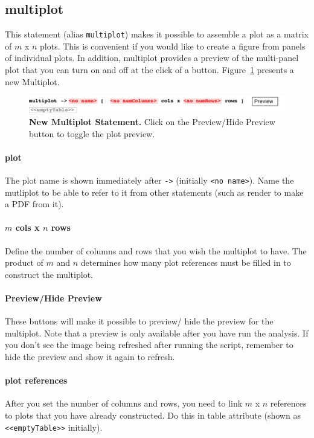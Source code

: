\subsection{multiplot}\label{subsec:Multiplot}
This statement (alias \texttt{multiplot}) makes it possible to assemble a plot as a matrix of $m$ x $n$ plots. This is convenient if you would like to create a figure from panels of individual plots. In addition, multiplot provides a preview of the multi-panel plot that you can turn on and off at the click of a button. Figure~\ref{fig:NewMultiplot} presents a new Multiplot.


\begin{figure}[h!tbp]
  \centering
  \includegraphics[width=\figWidthWide]{figures/NewMultiplot.pdf}
\caption[New Multiplot Statement.]{\textbf{New Multiplot Statement.} Click on the Preview/Hide Preview button to toggle the plot preview.}
\label{fig:NewMultiplot}
\end{figure}

\paragraph{plot}
The plot name is shown immediately after \texttt{->} (initially \texttt{<no name>}). Name the mutliplot to be able to refer to it from other statements (such as render to make a PDF from it).
\paragraph{$m$ cols x $n$ rows}
Define the number of columns and rows that you wish the multiplot to have. 
The product of $m$ and $n$ determines how many plot references must be filled in to construct the multiplot.

\paragraph{Preview/Hide Preview}
These buttons will make it possible to preview/ hide the preview for the multiplot. Note that a preview is only available after you have run the analysis. If you don't see the image being refreshed after running the script, remember to hide the preview and show it again to refresh.

\paragraph{plot references}
After you set the number of columns and rows, you need to link  $m$ x $n$ references to plots that you have already constructed. Do this in table attribute (shown as \texttt{<<emptyTable>>} initially).


